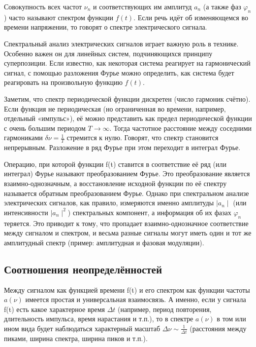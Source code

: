 \documentclass[a4paper,12pt]{article}
\begin{document}
Совокупность всех частот $\nu_n$ и соответствующих им амплитуд $a_n$ (а также фаз $\varphi_n$) часто называют спектром функции $f(t)$. Если речь идёт об изменяющемся во времени напряжении, то говорят о спектре электрического сигнала.

Спектральный анализ электрических сигналов играет важную роль в технике. Особенно важен он для линейных систем, подчиняющихся принципу суперпозиции. Если известно, как некоторая система реагирует на гармонический сигнал, с помощью разложения Фурье можно определить, как система будет реагировать на произвольную функцию $f(t)$.

Заметим, что спектр периодической функции дискретен (число гармоник счётно). Если функция не периодическая (но ограниченная во времени, например, отдельный «импульс»), её можно представить как предел периодической функции с очень большим периодом $T \rightarrow \infty$. Тогда частотное расстояние между соседними гармониками $\delta \nu = \frac{1}{T}$ стремится к нулю. Говорят, что спектр становится непрерывным. Разложение в ряд Фурье при этом переходит в интеграл Фурье.

Операцию, при которой функции f(t) ставится в соответствие её ряд (или интеграл) Фурье называют преобразованием Фурье. Это преобразование является взаимно-однозначным, а восстановление исходной функции по её спектру называется обратным преобразованием Фурье. Однако при спектральном анализе электрических сигналов, как правило, измеряются именно амплитуды $\mid a_n \mid$ (или интенсивности $\mid a_n \mid^2$) спектральных компонент, а информация об их фазах $\varphi_n$ теряется. Это приводит к тому, что пропадает взаимно-однозначное соответствие между сигналом и спектром, и весьма разные сигналы могут иметь один и тот же амплитудный спектр (пример: амплитудная и фазовая модуляции).

\subsection*{Соотношения неопределённостей}

Между сигналом как функцией времени f(t) и его спектром как функции частоты $a(\nu)$ имеется простая и универсальная взаимосвязь. А именно, если у сигнала f(t) есть какое характерное время $\Delta t$ (например, период повторения, длительность импульса, время нарастания и т.п.), то в спектре $a(\nu)$ в том или ином вида будет наблюдаться характерный масштаб $\Delta \nu \sim \frac{1}{\Delta t}$ (расстояния между пиками, ширина спектра, ширина пиков и т.п.).
\end{document}
